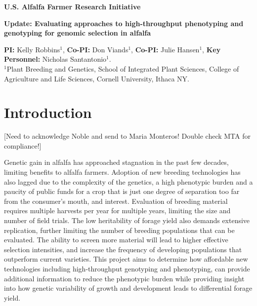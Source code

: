 \documentclass[12pt, letterpaper]{article}
\author{Nicholas Santantonio}
\date{\today}
\begin{document}
\begin{center}
\large{\textbf{U.S. Alfalfa Farmer Research Initiative}}
\end{center}


\begin{center}
\Large{\textbf{Update: Evaluating approaches to high-throughput phenotyping and genotyping for genomic selection in alfalfa}}
\end{center}


\noindent \textbf{PI:} Kelly Robbins$^1$, \textbf{Co-PI:} Don Viands$^1$, \textbf{Co-PI:} Julie Hansen$^1$, \noindent \textbf{Key Personnel:} Nicholas Santantonio$^1$. \\
\noindent $^1$Plant Breeding and Genetics, School of Integrated Plant Sciences, College of Agriculture and Life Sciences, Cornell University, Ithaca NY.

\section{Introduction}

[Need to acknowledge Noble and send to Maria Monteros! Double check MTA for compliance!]

Genetic gain in alfalfa has approached stagnation in the past few decades, limiting benefits to alfalfa farmers. Adoption of new breeding technologies has also lagged due to the complexity of the genetics, a high phenotypic burden and a paucity of public funds for a crop that is just one degree of separation too far from the consumer's mouth, and interest. Evaluation of breeding material requires multiple harvests per year for multiple years, limiting the size and number of field trials. The low heritability of forage yield also demands extensive replication, further limiting the number of breeding populations that can be evaluated. The ability to screen more material will lead to higher effective selection intensities, and increase the frequency of developing populations that outperform current varieties. This project aims to determine how affordable new technologies including high-throughput genotyping and phenotyping, can provide additional information to reduce the phenotypic burden while providing insight into how genetic variability of growth and development leads to differential forage yield. 
\end{document}
